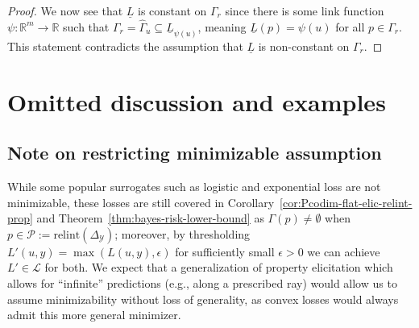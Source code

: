\documentclass[11pt]{article} %
\newcommand{\Comments}{1}
\newcommand{\mytodo}[2]{\ifnum\Comments=1%
	\todo[linecolor=#1!80!black,backgroundcolor=#1,bordercolor=#1!80!black]{#2}\fi}
\newcommand{\botodo}[1]{\mytodo{blue!20!white}{[Bo: #1]}}
\newcommand{\btw}[1]{}%
\newcommand{\reals}{\mathbb{R}}
\newcommand{\simplex}{\Delta_\Y}
\newcommand{\relint}[1]{\mathrm{relint}(#1)}
\newcommand{\eliccvx}{\mathrm{elic}_\mathrm{cvx}}
\renewcommand{\L}{\mathcal{L}}
\renewcommand{\P}{\mathcal{P}}
\newcommand{\Y}{\mathcal{Y}}
\newcommand{\lbar}{\underline{L}} %
\begin{document}
\begin{proof}
  We now see that $\lbar$ is constant on $\Gamma_r$ since there is some link function $\psi:\reals^m\to\reals$ such that $\Gamma_r = \hat\Gamma_u \subseteq \lbar_{\psi(u)}$, meaning $\lbar(p) = \psi(u)$ for all $p\in\Gamma_r$.
  This statement contradicts the assumption that $\lbar$ is non-constant on $\Gamma_r$.
\end{proof}



%
%

\section{Omitted discussion and examples}\label{app:omitted}

\subsection{Note on restricting minimizable assumption}\label{app:minnable-assumption}
While some popular surrogates such as logistic and exponential loss are not minimizable, these losses are still covered in Corollary~\ref{cor:Pcodim-flat-elic-relint-prop} and Theorem~\ref{thm:bayes-risk-lower-bound} as $\Gamma(p) \neq \emptyset$ when $p\in\P := \relint\simplex$; moreover, by thresholding $L'(u,y) = \max(L(u,y),\epsilon)$ for sufficiently small $\epsilon>0$ we can achieve $L'\in\L$ for both.
We expect that a generalization of property elicitation which allows for ``infinite'' predictions (e.g., along a prescribed ray) would allow us to assume minimizability without loss of generality, as convex losses would always admit this more general minimizer.
\btw{Some refs / related work commented out here.  I think not as relevant as elicitation complexity.}
\end{document}
